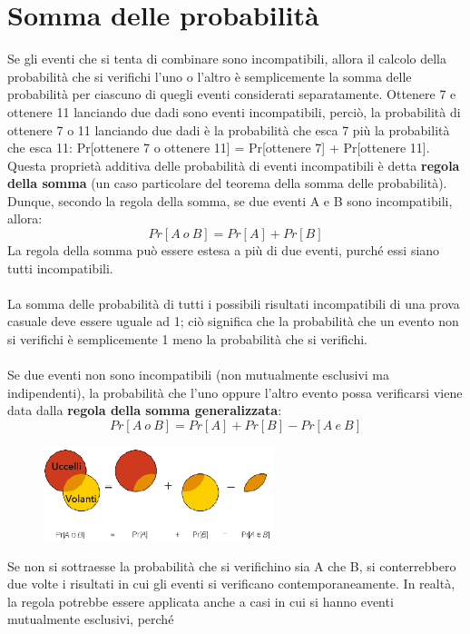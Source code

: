 \documentclass[10pt, draft]{book}
\begin{document}
\section{Somma delle probabilità}
Se gli eventi che si tenta di combinare sono incompatibili, allora il calcolo della probabilità che si verifichi l'uno o l'altro è semplicemente la somma delle probabilità per ciascuno di quegli eventi considerati separatamente. Ottenere 7 e ottenere 11 lanciando due dadi sono eventi incompatibili, perciò, la probabilità di ottenere 7 o 11 lanciando due dadi è la probabilità che esca 7 più la probabilità che esca 11: Pr[ottenere 7 o ottenere 11] = Pr[ottenere 7] + Pr[ottenere 11].
\\
Questa proprietà additiva delle probabilità di eventi incompatibili è detta \textbf{regola della somma} (un caso particolare del teorema della somma delle probabilità). 
\\
Dunque, secondo la regola della somma, se due eventi A e B sono incompatibili, allora: 
\begin{equation}
    Pr[A\ o\ B] = Pr[A] + Pr[B]
\end{equation}
La regola della somma può essere estesa a più di due eventi, purché essi siano tutti incompatibili.
\\
\\
La somma delle probabilità di tutti i possibili risultati incompatibili di una prova casuale deve essere uguale ad 1; ciò significa che la probabilità che un evento non si verifichi è semplicemente 1 meno la probabilità che si verifichi.
\\
\\
Se due eventi non sono incompatibili (non mutualmente esclusivi ma indipendenti), la probabilità che l'uno oppure l'altro evento possa verificarsi viene data dalla \textbf{regola della somma generalizzata}:
\begin{equation}
    Pr[A\ o\ B] = Pr[A] + Pr[B] - Pr[A\ e\ B]
\end{equation}
\begin{figure}[h]\label{fig5.5-2}
    \centering
    \includegraphics[width=0.6\textwidth]{fig5.5-2}
    \caption{\small{}}
\end{figure}
Se non si sottraesse la probabilità che si verifichino sia A che B, si conterrebbero due volte i risultati in cui gli eventi si verificano contemporaneamente.
In realtà, la regola potrebbe essere applicata anche a casi in cui si hanno eventi mutualmente esclusivi, \colorbox{lyellow}{perché}
\end{document}
